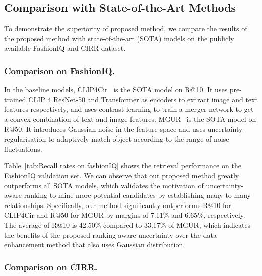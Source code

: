 \documentclass[letterpaper]{article} \usepackage{aaai24}  \usepackage{times}  \usepackage{helvet}  \usepackage{courier}  \usepackage[hyphens]{url}  \usepackage{graphicx} \urlstyle{rm} \def\UrlFont{\rm}  \usepackage{natbib}  \usepackage{caption} \frenchspacing  \setlength{\pdfpagewidth}{8.5in} \setlength{\pdfpageheight}{11in} \usepackage{amsmath,amsfonts}
\begin{document}
\subsection{Comparison with State-of-the-Art Methods}
To demonstrate the superiority of proposed method, we compare the results of the proposed method with state-of-the-art (SOTA) models on the publicly available FashionIQ and CIRR dataset. 

\subsubsection{Comparison on FashionIQ.}
In the baseline models, CLIP4Cir~\cite{Baldrati2022combiner} is the SOTA model on R@10. It uses pre-trained CLIP 4  ResNet-50 and Transformer as encoders to extract image and text features respectively, and uses contrast learning to train a merger network to get a convex combination of text and image features. MGUR~\cite{chen2022composed} is the SOTA model on R@50. It introduces Gaussian noise in the feature space and uses uncertainty regularisation to adaptively match object according to the range of noise fluctuations. 

Table~\ref{tab:Recall rates on fashionIQ} shows the retrieval performance on the FashionIQ validation set. We can observe that our proposed method greatly outperforms all SOTA models, which validates the motivation of uncertainty-aware ranking to mine more potential candidates by establishing many-to-many relationships. Specifically, our method significantly outperforms R@10 for CLIP4Cir and R@50 for MGUR by margins of 7.11\% and 6.65\%, respectively. The average of R@10 is 42.50\% compared to 33.17\% of MGUR, which indicates the benefits of the proposed ranking-aware uncertainty over the data enhancement method that also uses Gaussian distribution. 


\subsubsection{Comparison on CIRR.}
\end{document}
